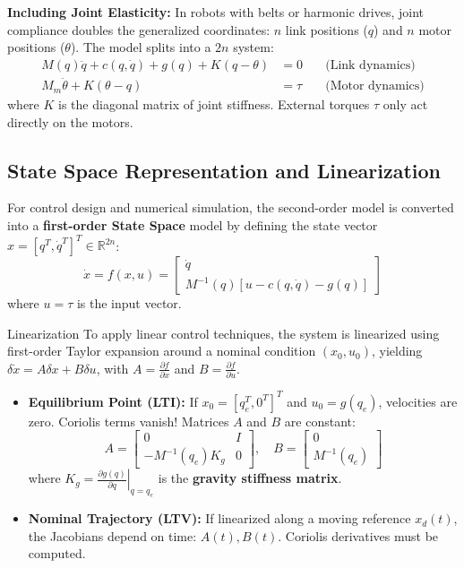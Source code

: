 \documentclass[11pt,a4paper]{article}
\begin{document}
\textbf{Including Joint Elasticity:} In robots with belts or harmonic drives, joint compliance doubles the generalized coordinates: $n$ link positions ($q$) and $n$ motor positions ($\theta$). The model splits into a $2n$ system:
\begin{align}
    M(q)\ddot{q} + c(q,\dot{q}) + g(q) + K(q - \theta) &= 0 \quad &\text{(Link dynamics)} \\
    M_m\ddot{\theta} + K(\theta - q) &= \tau \quad &\text{(Motor dynamics)}
\end{align}
where $K$ is the diagonal matrix of joint stiffness. External torques $\tau$ only act directly on the motors.

\subsection{State Space Representation and Linearization}
For control design and numerical simulation, the second-order model is converted into a \textbf{first-order State Space} model by defining the state vector $x = [q^T, \dot{q}^T]^T \in \mathbb{R}^{2n}$:
\begin{equation}
    \dot{x} = f(x, u) = \begin{bmatrix} \dot{q} \\ M^{-1}(q) [u - c(q, \dot{q}) - g(q)] \end{bmatrix}
\end{equation}
where $u = \tau$ is the input vector.

\begin{theorybox}{Linearization}
To apply linear control techniques, the system is linearized using first-order Taylor expansion around a nominal condition $(x_0, u_0)$, yielding $\delta\dot{x} = A \delta x + B \delta u$, with $A = \frac{\partial f}{\partial x}$ and $B = \frac{\partial f}{\partial u}$.
\begin{itemize}
    \item \textbf{Equilibrium Point (LTI):} If $x_0 = [q_e^T, 0^T]^T$ and $u_0 = g(q_e)$, velocities are zero. Coriolis terms vanish! Matrices $A$ and $B$ are constant:
    \[ A = \begin{bmatrix} 0 & I \\ -M^{-1}(q_e) K_g & 0 \end{bmatrix}, \quad B = \begin{bmatrix} 0 \\ M^{-1}(q_e) \end{bmatrix} \]
    where $K_g = \left. \frac{\partial g(q)}{\partial q} \right|_{q=q_e}$ is the \textbf{gravity stiffness matrix}.
    \item \textbf{Nominal Trajectory (LTV):} If linearized along a moving reference $x_d(t)$, the Jacobians depend on time: $A(t), B(t)$. Coriolis derivatives must be computed.
\end{itemize}
\end{theorybox}
\end{document}
